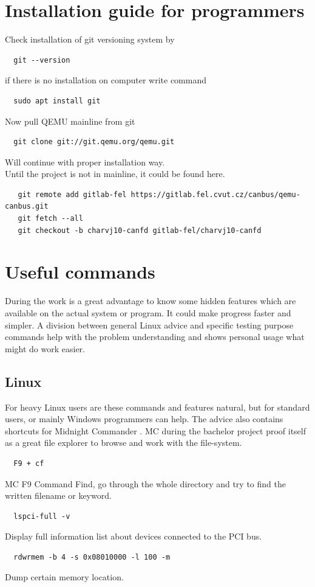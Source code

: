 \documentclass{ctuthesis}
\begin{document}
\appendix
\chapter{Installation guide for programmers}
  Check installation of git versioning system by
  \begin{verbatim}  git --version\end{verbatim}
  if there is no installation on computer write command
  \begin{verbatim}  sudo apt install git\end{verbatim}
  Now pull QEMU mainline from git
 \begin{verbatim}  git clone git://git.qemu.org/qemu.git\end{verbatim}
  Will continue with proper installation way. \\
  Until the project is not in mainline, it could be found here.
  \begin{verbatim}   git remote add gitlab-fel https://gitlab.fel.cvut.cz/canbus/qemu-canbus.git
   git fetch --all
   git checkout -b charvj10-canfd gitlab-fel/charvj10-canfd\end{verbatim}

\chapter{Useful commands}
  During the work is a great advantage to know some hidden features which are available on the actual system or program. It could make progress faster and simpler. A division between general Linux advice and specific testing purpose commands help with the problem understanding and shows personal usage what might do work easier.
 \section{Linux}
  For heavy Linux users are these commands and features natural, but for standard users, or mainly Windows programmers can help. The advice also contains shortcuts for Midnight Commander \cite{mc}. MC during the bachelor project proof itself as a great file explorer to browse and work with the file-system.
  \begin{verbatim}  F9 + cf\end{verbatim}
  MC F9 Command Find, go through the whole directory and try to find the written filename or keyword.
  \begin{verbatim}  lspci-full -v\end{verbatim}
  Display full information list about devices connected to the PCI bus.
  \begin{verbatim}  rdwrmem -b 4 -s 0x08010000 -l 100 -m\end{verbatim}
  Dump certain memory location. \cite{rdwrmem}
 
\end{document}
